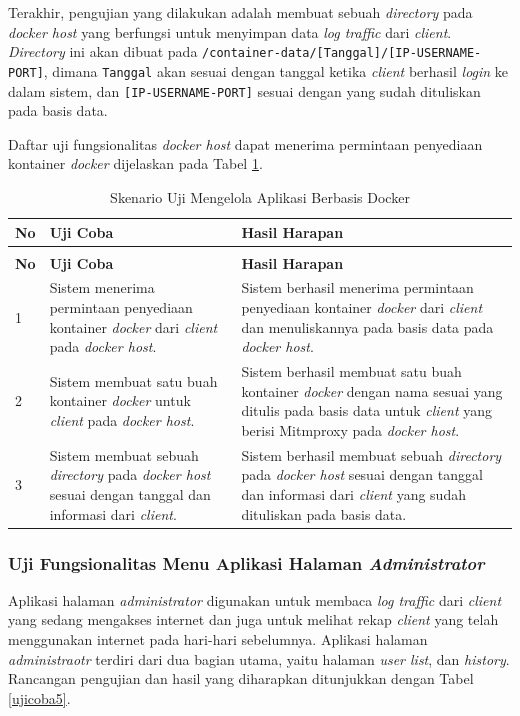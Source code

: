 Terakhir, pengujian yang dilakukan adalah membuat sebuah \textit{directory} pada \textit{docker host} yang berfungsi untuk menyimpan data \textit{log traffic} dari \textit{client}. \textit{Directory} ini akan dibuat pada \texttt{/container-data/[Tanggal]/[IP-USERNAME-PORT]}, dimana \texttt{Tanggal} akan sesuai dengan tanggal ketika \textit{client} berhasil \textit{login} ke dalam sistem, dan \texttt{[IP-USERNAME-PORT]} sesuai dengan yang sudah dituliskan pada basis data.

Daftar uji fungsionalitas \textit{docker host} dapat menerima permintaan penyediaan kontainer \textit{docker} dijelaskan pada Tabel \ref{ujicoba3}.

\begin{longtable}{|p{}|p{}|p{}|}					\caption{Skenario Uji \textit{Docker Host} dapat Menerima Permintaan Penyediaan Kontainer \textit{Docker}} \label{ujicoba3} \\
	\hline
	\textbf{No} & \textbf{Uji Coba} & \textbf{Hasil Harapan} \\ \hline
	\endfirsthead
	\caption[]{Skenario Uji Mengelola Aplikasi Berbasis Docker} \\
	\hline
	\textbf{No} & \textbf{Uji Coba} & \textbf{Hasil Harapan} \\ \hline
	\endhead
	\endfoot
	\endlastfoot
	
	1 & Sistem menerima permintaan penyediaan kontainer \textit{docker} dari \textit{client} pada \textit{docker host}. & Sistem berhasil menerima permintaan penyediaan kontainer \textit{docker} dari \textit{client} dan menuliskannya pada basis data pada \textit{docker host}.\\ \hline
	2 & Sistem membuat satu buah kontainer \textit{docker} untuk \textit{client} pada \textit{docker host}. & Sistem berhasil membuat satu buah kontainer \textit{docker} dengan nama sesuai yang ditulis pada basis data untuk \textit{client} yang berisi Mitmproxy pada \textit{docker host}.\\ \hline
	3 & Sistem membuat sebuah \textit{directory} pada \textit{docker host} sesuai dengan tanggal dan informasi dari \textit{client}. & Sistem berhasil membuat sebuah \textit{directory} pada \textit{docker host} sesuai dengan tanggal dan informasi dari \textit{client} yang sudah dituliskan pada basis data.\\ \hline
\end{longtable}

\subsubsection{Uji Fungsionalitas Menu Aplikasi Halaman \textit{Administrator}} \label{kelima}
Aplikasi halaman \textit{administrator} digunakan untuk membaca \textit{log traffic} dari \textit{client} yang sedang mengakses internet dan juga untuk melihat rekap \textit{client} yang telah menggunakan internet pada hari-hari sebelumnya. Aplikasi halaman \textit{administraotr} terdiri dari dua bagian utama, yaitu halaman \textit{user list}, dan \textit{history}. Rancangan pengujian dan hasil yang diharapkan ditunjukkan dengan Tabel \ref{ujicoba5}.

